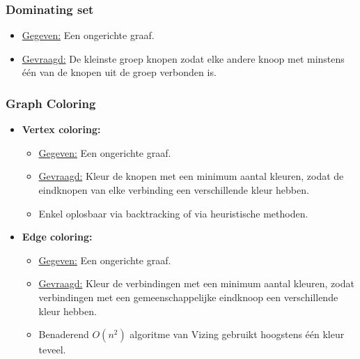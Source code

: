 \documentclass{report}
\begin{document}
\subsubsection{Dominating set}
\begin{itemize}
	\item[\info] \underline{Gegeven:} Een ongerichte graaf.
	\item[\info] \underline{Gevraagd:} De kleinste groep knopen zodat elke andere knoop met minstens één van de knopen uit de groep verbonden is.
\end{itemize}
\subsubsection{Graph Coloring}
\begin{itemize}
	\item \textbf{Vertex coloring:}
	\begin{itemize}
		\item[\info] \underline{Gegeven:} Een ongerichte graaf.
		\item[\info] \underline{Gevraagd:} Kleur de knopen met een minimum aantal kleuren, zodat de eindknopen van elke verbinding een verschillende kleur hebben.
		\item[\info] Enkel oplosbaar via backtracking of via heuristische methoden.
	\end{itemize}
	\item \textbf{Edge coloring:}
	\begin{itemize}
		\item[\info] \underline{Gegeven:} Een ongerichte graaf.
		\item[\info] \underline{Gevraagd:} Kleur de verbindingen met een minimum aantal kleuren, zodat verbindingen met een gemeenschappelijke eindknoop een verschillende kleur hebben.
		\item[\info] Benaderend $O(n^2)$ algoritme van Vizing gebruikt hoogstens één kleur teveel.
	\end{itemize}
\end{itemize}
\end{document}
